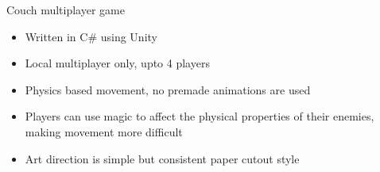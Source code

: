 \item Couch multiplayer game
\begin{itemize}
    \item Written in C\# using Unity
    \item Local multiplayer only, upto 4 players
    \item Physics based movement, no premade animations are used
    \item Players can use magic to affect the physical properties of their enemies, making movement more difficult
    \item Art direction is simple but consistent paper cutout style
\end{itemize}
